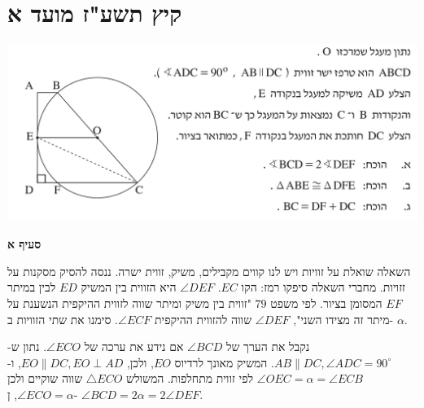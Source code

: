 \documentclass[12pt,a4paper]{article}
\begin{document}

\newpage

\section{קיץ תשע"ז מועד א}

\begin{center}
\includegraphics[width=\textwidth]{summer-2017a-4}
\end{center}
\vspace{-6mm}

\textbf{סעיף א}

השאלה שואלת על זוויות ויש לנו קווים מקבילים, משיק, זווית ישרה. ננסה להסיק מסקנות על זזויות. מחברי השאלה סיפקו רמז: הקו 
$EC$.
$\angle DEF$
היא הזווית בין המשיק
$ED$
לבין במיתר 
$EF$
המסומן בציור. לפי משפט 
$79$
"זווית בין משיק ומיתר שווה לזווית ההיקפית הנשענת על מיתר זה מצידו השני",
$\angle DEF$
שווה להזווית ההיקפית
$\angle ECF$.
סימנו את שתי הזוויות ב-%
$\alpha$.

נקבל את הערך של
$\angle BCD$
אם נידע את ערכה של
$\angle ECO$.
נתון ש-%
$AB\|DC,\angle ADC=90^\circ$.
המשיק מאונך לרדיוס
$EO$,
ולכן, 
$EO\|DC,EO\perp AD$,
ו-%
$\angle OEC=\alpha=\angle ECB$
לפי זווית מתחלפות. המשולש
$\triangle ECO$
שווה שוקיים ולכן
$\angle ECO=\alpha$,
ן-%
$\angle BCD=2\alpha= 2\angle{DEF}$.
\end{document}
